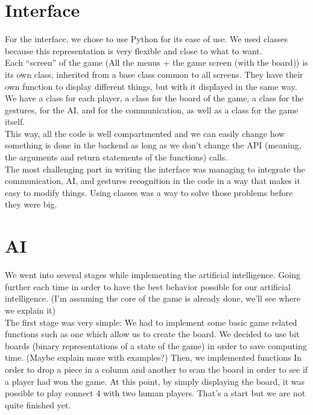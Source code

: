\documentclass[12pt, a4paper, oneside]{report}
\begin{document}
	\section{Interface}
	For the interface, we chose to use Python for its ease of use. We used classes because this representation is very flexible and close to what to want. \\

	Each “screen” of the game (All the menus + the game screen (with the board)) is its own class, inherited from a base class common to all screens. They have their own function to display different things, but with it displayed in the same way. \\ %

	We have a class for each player, a class for the board of the game, a class for the gestures, for the AI, and for the communication, as well as a class for the game itself. \\
	This way, all the code is well compartmented and we can easily change how something is done in the backend as long as we don't change the API (meaning, the arguments and return statements of the functions) calls. \\

	The most challenging part in writing the interface was managing to integrate the communication, AI, and gestures recognition in the code in a way that makes it easy to modify things. Using classes was a way to solve those problems before they were big.

	\section{AI}\label{AI_section}

	We went into several stages while implementing the artificial intelligence. Going further each time in order to have the best behavior possible for our artificial intelligence. (I’m assuming the core of the game is already done, we’ll see where we explain it)\\

The first stage was very simple:
 	We had to implement some basic game related functions such as one which allow us to create the board. We decided to use bit boards (binary representations of a state of the game) in order to save computing time. (Maybe explain more with examples?)
	Then, we implemented functions In order to drop a piece in a column and another to scan the board in order to see if a player had won the game. At this point, by simply displaying the board, it was possible to play connect 4 with two human players. That’s a start but we are not quite finished yet. \\
\end{document}
